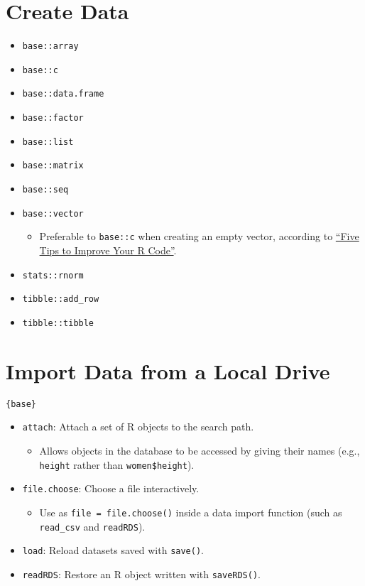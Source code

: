 \documentclass[]{book}
\providecommand{\tightlist}{%
  \setlength{\itemsep}{0pt}\setlength{\parskip}{0pt}}
\begin{document}
\hypertarget{create-data}{%
\section{Create Data}\label{create-data}}

\begin{itemize}
\tightlist
\item
  \texttt{base::array}
\item
  \texttt{base::c}
\item
  \texttt{base::data.frame}
\item
  \texttt{base::factor}
\item
  \texttt{base::list}
\item
  \texttt{base::matrix}
\item
  \texttt{base::seq}
\item
  \texttt{base::vector}

  \begin{itemize}
  \tightlist
  \item
    Preferable to \texttt{base::c} when creating an empty vector, according to \href{https://www.datacamp.com/community/tutorials/five-tips-r-code-improve}{``Five Tips to Improve Your R Code''}.
  \end{itemize}
\item
  \texttt{stats::rnorm}
\item
  \texttt{tibble::add\_row}
\item
  \texttt{tibble::tibble}
\end{itemize}

\hypertarget{import-data-from-a-local-drive}{%
\section{Import Data from a Local Drive}\label{import-data-from-a-local-drive}}

\texttt{\{base\}}

\begin{itemize}
\tightlist
\item
  \texttt{attach}: Attach a set of R objects to the search path.

  \begin{itemize}
  \tightlist
  \item
    Allows objects in the database to be accessed by giving their names (e.g., \texttt{height} rather than \texttt{women\$height}).
  \end{itemize}
\item
  \texttt{file.choose}: Choose a file interactively.

  \begin{itemize}
  \tightlist
  \item
    Use as \texttt{file\ =\ file.choose()} inside a data import function (such as \texttt{read\_csv} and \texttt{readRDS}).
  \end{itemize}
\item
  \texttt{load}: Reload datasets saved with \texttt{save()}.
\item
  \texttt{readRDS}: Restore an R object written with \texttt{saveRDS()}.
\end{itemize}
\end{document}
